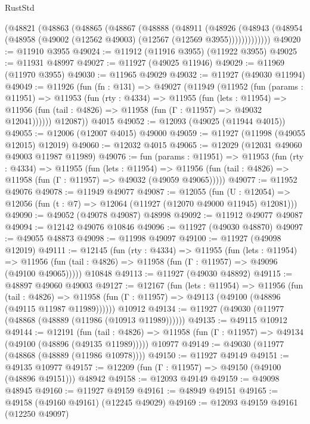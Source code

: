 \begin{lexlean}{RustStd}
\begin{coremodule}
    (@48821
      (@48863
        (@48865
          (@48867
            (@48888
              (@48911
                (@48926
                  (@48943 (@48954 (@48958 (@49002 (@12562 @49003) (@12567 (@12569 @3955)))))))))))))
@49020 := @11910 @3955
@49024 := @11912 (@11916 @3955) (@11922 @3955)
@49025 := @11931 @48997
@49027 := @11927 (@49025 @11946)
@49029 := @11969 (@11970 @3955)
@49030 := @11965 @49029
@49032 := @11927 (@49030 @11994)
@49049 := @11926
    (fun (fn : @131) =>
    @49027
      (@11949
        (@11952
          (fun (params : @11951) =>
          @11953
            (fun (rty : @4334) =>
            @11955
              (fun (lets : @11954) =>
              @11956 (fun (tail : @4826) => @11958 (fun (Γ : @11957) => @49032 @12041))))))
        @12087))
    @4015
@49052 := @12093 (@49025 (@11944 @4015))
@49055 := @12006 (@12007 @4015) @49000
@49059 := @11927 (@11998 (@49055 @12015) @12019)
@49060 := @12032 @4015
@49065 := @12029 (@12031 @49060 @49003 @11987 @11989)
@49076 := fun (params : @11951) =>
  @11953
    (fun (rty : @4334) =>
    @11955
      (fun (lets : @11954) =>
      @11956 (fun (tail : @4826) => @11958 (fun (Γ : @11957) => @49032 (@49059 @49065)))))
@49077 := @11952 @49076
@49078 := @11949 @49077
@49087 := @12055
    (fun (U : @12054) => @12056 (fun (t : @7) => @12064 (@11927 (@12070 @49000 @11945) @12081)))
@49090 := @49052 (@49078 @49087) @48998
@49092 := @11912 @49077 @49087
@49094 := @12142 @49076 @10846
@49096 := @11927 (@49030 @48870)
@49097 := @49055 @48873
@49098 := @11998 @49097
@49100 := @11927 (@49098 @12019)
@49111 := @12145
    (fun (rty : @4334) =>
    @11955
      (fun (lets : @11954) =>
      @11956 (fun (tail : @4826) => @11958 (fun (Γ : @11957) => @49096 (@49100 @49065)))))
    @10848
@49113 := @11927 (@49030 @48892)
@49115 := @48897 @49060 @49003
@49127 := @12167
    (fun (lets : @11954) =>
    @11956
      (fun (tail : @4826) =>
      @11958 (fun (Γ : @11957) => @49113 (@49100 (@48896 (@49115 @11987 @11989))))))
    @10912
@49134 := @11927 (@49030 (@11977 (@48868 (@48889 (@11986 (@10913 @11989))))))
@49135 := @49115 @10912
@49144 := @12191
    (fun (tail : @4826) => @11958 (fun (Γ : @11957) => @49134 (@49100 (@48896 (@49135 @11989)))))
    @10977
@49149 := @49030 (@11977 (@48868 (@48889 (@11986 @10978))))
@49150 := @11927 @49149
@49151 := @49135 @10977
@49157 := @12209 (fun (Γ : @11957) => @49150 (@49100 (@48896 @49151))) @48942
@49158 := @12093 @49149
@49159 := @49098 @48945
@49160 := @11927 @49159
@49161 := @48949 @49151
@49165 := @49158 (@49160 @49161) (@12245 @49029)
@49169 := @12093 @49159 @49161 (@12250 @49097)

\end{coremodule}
\end{lexlean}
